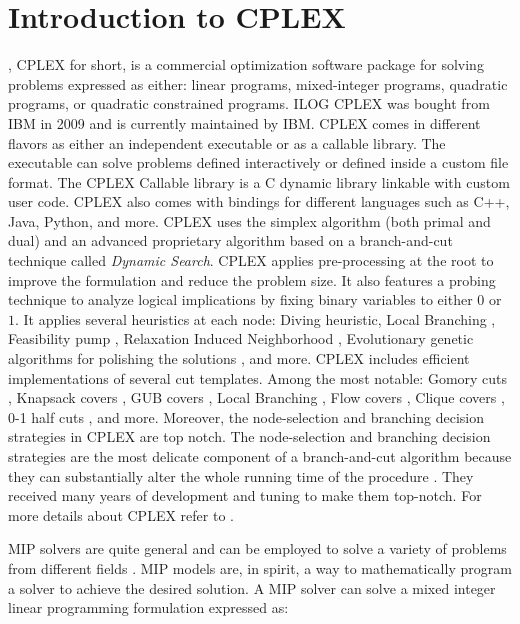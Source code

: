 \chapter{Introduction to CPLEX}
\label{sec:introduction-to-cplex}

,
CPLEX for short,
is a commercial optimization software package for solving problems expressed as either:
linear programs, mixed-integer programs, quadratic programs, or quadratic constrained programs.
ILOG CPLEX was bought from IBM in 2009 and is currently maintained by IBM.
CPLEX comes in different flavors as either an independent executable or as a callable library.
The executable can solve problems defined interactively or defined inside a custom file format.
The CPLEX Callable library is a C dynamic library linkable with custom user code.
CPLEX also comes with bindings for different languages such as C++, Java, Python, and more.
CPLEX uses the simplex algorithm (both primal and dual) and an advanced proprietary algorithm based on a branch-and-cut technique called \textit{Dynamic Search}.
CPLEX applies pre-processing at the root to improve the formulation and reduce the problem size.
It also features a probing technique to analyze logical implications by fixing binary variables to either $0$ or $1$.
It applies several heuristics at each node: Diving heuristic, Local Branching \parencite{fischetti2003}, Feasibility pump \parencite{fischetti2005}, Relaxation Induced Neighborhood \parencite{danna2005}, Evolutionary genetic algorithms for polishing the solutions \parencite{rothberg2007}, and more.
CPLEX includes efficient implementations of several cut templates.
Among the most notable: Gomory cuts \parencite{chvatal1973}, Knapsack covers \parencite{letchford2020lifting}, GUB covers \parencite{wolsey1990valid}, Local Branching \parencite{fischetti2003}, Flow covers \parencite{padberg1985valid}, Clique covers \parencite{brigham1983clique}, 0-1 half cuts \parencite{caprara1996}, and more.
Moreover, the node-selection and branching decision strategies in CPLEX are top notch.
The node-selection and branching decision strategies
are the most delicate component of a branch-and-cut algorithm
because they can substantially alter the whole running time of the procedure \parencite{lodi2013a}.
They received many years of development and tuning to make them top-notch.
For more details about CPLEX refer to \textcite{lima2010, lodi2013}.

MIP solvers are quite general and can be employed to solve a variety of problems from different fields \parencite{bixby2007progress}.
MIP models are, in spirit, a way to mathematically program a solver to achieve the desired solution.
A MIP solver can solve a mixed integer linear programming formulation expressed as:


